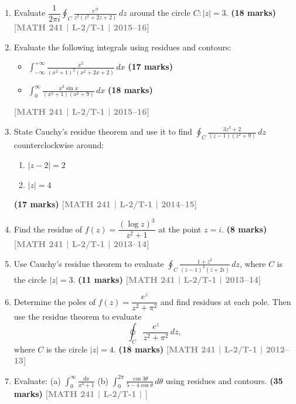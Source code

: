 \documentclass[12pt]{article}
\newcommand{\yr}[1]{\hfill\textcolor{gray}{\small\textbf{[#1]}}}
\newcommand{\mk}[1]{\textcolor{orange!70!black}{\small\textbf{(#1 marks)}}}
\begin{document}
\begin{enumerate}
\item Evaluate $\dfrac{1}{2\pi i}\displaystyle\oint_{C}\frac{e^{zt}}{z^{2}(z^{2}+2z+2)}\,dz$ around the circle $C:|z|=3$.
\mk{18} \yr{MATH 241 | L-2/T-1 | 2015--16}

\item Evaluate the following integrals using residues and contours:

\begin{itemize}
    \item[(a)] $\displaystyle \int_{-\infty}^{+\infty} \frac{x^2}{(x^2 + 1)^2 (x^2 + 2x + 2)} \, dx$
\mk{17}  
    
    \item[(b)] $\displaystyle \int_{0}^{\infty} \frac{x^3 \sin x}{(x^2 + 1)(x^2 + 9)} \, dx$
    \mk{18}
\end{itemize} 
\yr{MATH 241 | L-2/T-1 | 2015--16}

\item State Cauchy's residue theorem and use it to find $\displaystyle\oint_{C}\frac{3z^{3}+2}{(z-1)(z^{2}+9)}\,dz$ counterclockwise around:
\begin{enumerate}
  \item $|z-2|=2$
  \item $|z|=4$
\end{enumerate}
\mk{17} \yr{MATH 241 | L-2/T-1 | 2014--15}

\item Find the residue of $f(z)=\dfrac{(\log z)^{3}}{z^{2}+1}$ at the point $z=i$.
\mk{8} \yr{MATH 241 | L-2/T-1 | 2013--14}

\item Use Cauchy's residue theorem to evaluate $\displaystyle\oint_{C}\frac{1+z^{2}}{(z-1)^{2}(z+2i)}\,dz$, where $C$ is the circle $|z|=3$.
\mk{11} \yr{MATH 241 | L-2/T-1 | 2013--14}

\item Determine the poles of $f(z)=\dfrac{e^{z}}{z^{2}+\pi^{2}}$ and find residues at each pole. Then use the residue theorem to evaluate
\[
\oint_{C} \frac{e^{z}}{z^{2}+\pi^{2}}\,dz,
\]
where $C$ is the circle $|z|=4$.
\mk{18} \yr{MATH 241 | L-2/T-1 | 2012--13}

\item Evaluate: (a) $\displaystyle\int_{0}^{\infty}\frac{dx}{x^{4}+1}$ \quad (b) $\displaystyle\int_{0}^{2\pi}\frac{\cos 3\theta}{5-4\cos\theta}\,d\theta$ using residues and contours.
\mk{35} \yr{MATH 241 | L-2/T-1 | }

\end{enumerate}
\end{document}
